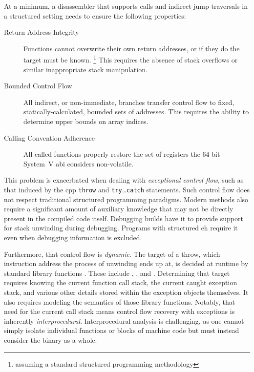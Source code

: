 At a minimum, a disassembler that supports calls and indirect jump traversals in a structured setting needs to ensure the following properties:
\begin{description}
  \item[Return Address Integrity] Functions cannot overwrite their own return addresses, or if they do the target must be known.%
  \footnote{assuming a standard structured programming methodology}
  This requires the absence of stack overflows or similar inappropriate stack manipulation.
  \item[Bounded Control Flow] All indirect, or non-immediate, branches transfer control flow to fixed, statically-calculated, bounded sets of addresses. This requires the ability to determine upper bounds on array indices.
  \item[Calling Convention Adherence] All called functions properly restore the set of registers the 64-bit System~V \ac{abi} considers non-volatile.
\end{description}

This problem is exacerbated when dealing with \emph{exceptional control flow}, such as that induced by the \gls{cpp} \lstinline|throw| and \lstinline|try|\dots\lstinline|catch| statements.
Such control flow does not respect traditional structured programming paradigms.
Modern methods also require a significant amount of auxiliary knowledge that may not be directly present in the compiled code itself.
Debugging builds have it to provide support for stack unwinding during debugging.
Programs with structured \ac{eh} require it even when debugging information is excluded.

Furthermore, that control flow is \emph{dynamic}.
The target of a throw, which instruction address the process of unwinding ends up at, is decided at runtime by standard library functions \autocite{cxxEhAbi}.
These include , ,
and .
Determining that target requires knowing the current function call stack, the current caught exception stack, and various other details stored within the exception objects themselves.
It also requires modeling the semantics of those library functions.
Notably, that need for the current call stack means control flow recovery with exceptions is inherently \emph{interprocedural}.
Interprocedural analysis is challenging, as one cannot simply isolate individual functions or blocks of machine code but must instead consider the binary as a whole.

